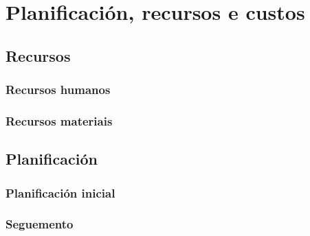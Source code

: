 %
%
\chapter[Planificación, recursos e custos]{
	Planificación, recursos e custos
	\label{ch.prc}
}

%
%
\section[Recursos]{
	Recursos}

\subsection{Recursos humanos}

\subsection{Recursos materiais}

\section[Planificación]{
	Planificación}

\subsection{Planificación inicial}

\subsection{Seguemento}

